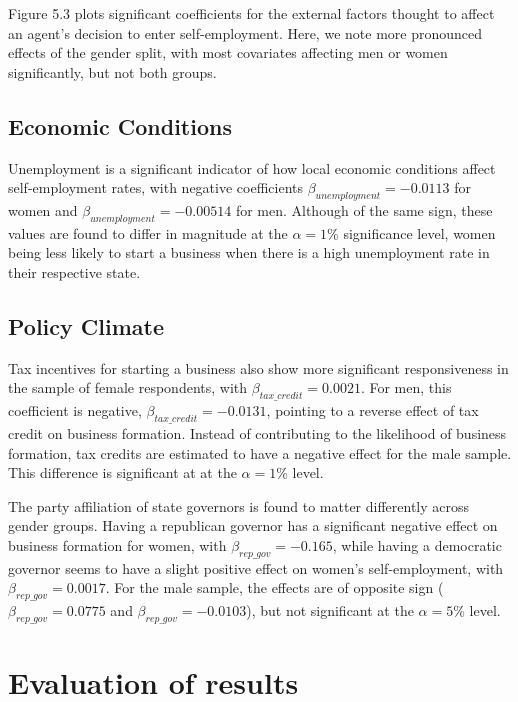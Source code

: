 Figure 5.3 plots significant coefficients for the external factors thought to affect an agent's decision to enter self-employment. Here, we note more pronounced effects of the gender split, with most covariates affecting men or women significantly, but not both groups. 

\subsection{Economic Conditions}

Unemployment is a significant indicator of how local economic conditions affect self-employment rates, with negative coefficients $\beta_{unemployment} = -0.0113$ for women and $\beta_{unemployment} = -0.00514$ for men. Although of the same sign, these values are found to differ in magnitude at the $\alpha = 1\% $ significance level, women being less likely to start a business when there is a high unemployment rate in their respective state. 

\subsection{Policy Climate}
Tax incentives for starting a business also show more significant responsiveness in the sample of female respondents, with  $\beta_{tax\_credit} = 0.0021$. For men, this coefficient is negative, $\beta_{tax\_credit} = -0.0131$, pointing to a reverse effect of tax credit on business formation. Instead of contributing to the likelihood of business formation, tax credits are estimated to have a negative effect for the male sample. This difference is significant at at the $\alpha = 1\% $ level. 

The party affiliation of state governors is found to matter differently across gender groups. Having a republican governor has a significant negative effect on business formation for women, with $\beta_{rep\_gov} = -0.165$, while having a democratic governor seems to have a slight positive effect on women's self-employment, with  $\beta_{rep\_gov} = 0.0017$. For the male sample, the effects are of opposite sign ($\beta_{rep\_gov} = 0.0775$ and $\beta_{rep\_gov} = -0.0103$), but not significant at the $\alpha = 5\% $ level. 

\section{Evaluation of results}

